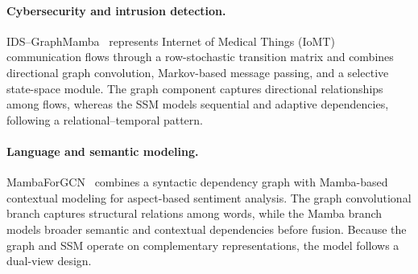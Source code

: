 \documentclass[acmsmall]{acmart}
\begin{document}
\paragraph{\textbf{Cybersecurity and intrusion detection.}}
IDS--GraphMamba~\cite{atitallah2025ids} represents Internet of Medical Things (IoMT) communication flows
through a row-stochastic transition matrix and combines directional graph
convolution, Markov-based message passing, and a selective state-space module.
The graph component captures directional relationships among flows, whereas
the SSM models sequential and adaptive dependencies, following a relational--temporal pattern.

\paragraph{\textbf{Language and semantic modeling.}}
MambaForGCN~\cite{lawan2024mambaforgcn} combines a syntactic dependency graph
with Mamba-based contextual modeling for aspect-based sentiment analysis. The
graph convolutional branch captures structural relations among words, while
the Mamba branch models broader semantic and contextual dependencies before
fusion. Because the graph and SSM operate on complementary representations,
the model follows a dual-view design.







\end{document}
